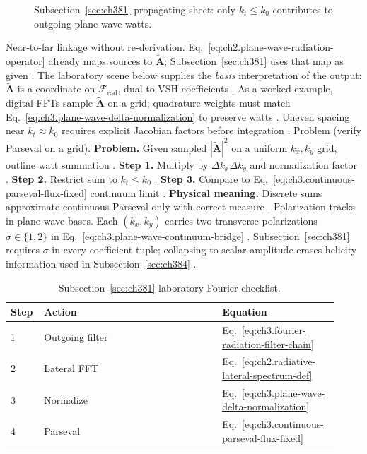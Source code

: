 \begin{figure}[t]
\centering
{}
\caption{Subsection~\ref{sec:ch381} propagating sheet: only \(k_{t}\le k_{0}\) contributes to outgoing plane-wave watts.}
\label{fig:ch3.381-propagating-sheet}
\end{figure}
Near-to-far linkage without re-derivation. Eq.~\eqref{eq:ch2.plane-wave-radiation-operator} already maps sources to \(\widetilde{\mathbf{A}}\); Subsection~\ref{sec:ch381}
uses that map as given \cite{stratton1941}. The laboratory scene below supplies the \emph{basis} interpretation of the
output: \(\widetilde{\mathbf{A}}\) is a coordinate on \(\mathcal{F}_{\mathrm{rad}}\), dual to VSH coefficients
\cite{hansen1988}.
As a worked example, digital FFTs sample \(\widetilde{\mathbf{A}}\) on a grid; quadrature weights must match Eq.~\eqref{eq:ch3.plane-wave-delta-normalization}
to preserve watts \cite{harrington2001}. Uneven spacing near \(k_{t}\approx k_{0}\) requires explicit Jacobian factors before
integration \cite{hansen1988}.
Problem (verify Parseval on a grid). \textbf{Problem.} Given sampled \(|\widetilde{\mathbf{A}}|^{2}\) on a uniform \(k_{x},k_{y}\) grid, outline watt summation
\cite{harrington2001}.
\textbf{Step 1.} Multiply by \(\Delta k_{x}\Delta k_{y}\) and normalization factor \cite{stratton1941}.
\textbf{Step 2.} Restrict sum to \(k_{t}\le k_{0}\) \cite{jackson1999}.
\textbf{Step 3.} Compare to Eq.~\eqref{eq:ch3.continuous-parseval-flux-fixed} continuum limit \cite{hansen1988}.
\textbf{Physical meaning.} Discrete sums approximate continuous Parseval only with correct measure \cite{harrington2001}.
Polarization tracks in plane-wave bases. Each \((k_{x},k_{y})\) carries two transverse polarizations \(\sigma\in\{1,2\}\) in
Eq.~\eqref{eq:ch3.plane-wave-continuum-bridge} \cite{stratton1941}. Subsection~\ref{sec:ch381} requires \(\sigma\) in every
coefficient tuple; collapsing to scalar amplitude erases helicity information used in Subsection~\ref{sec:ch384}
\cite{belinfante1940}.
\begin{table}[t]
\centering
\caption{Subsection~\ref{sec:ch381} laboratory Fourier checklist.}
\label{tab:ch3.381-checklist}
\small
\begin{tabular}{@{}p{0.08\linewidth}p{0.52\linewidth}p{0.32\linewidth}@{}}
\toprule
Step & Action & Equation \\
\midrule
1 & Outgoing filter & Eq.~\eqref{eq:ch3.fourier-radiation-filter-chain} \\
2 & Lateral FFT & Eq.~\eqref{eq:ch2.radiative-lateral-spectrum-def} \\
3 & Normalize & Eq.~\eqref{eq:ch3.plane-wave-delta-normalization} \\
4 & Parseval & Eq.~\eqref{eq:ch3.continuous-parseval-flux-fixed} \\
\bottomrule
\end{tabular}
\end{table}
